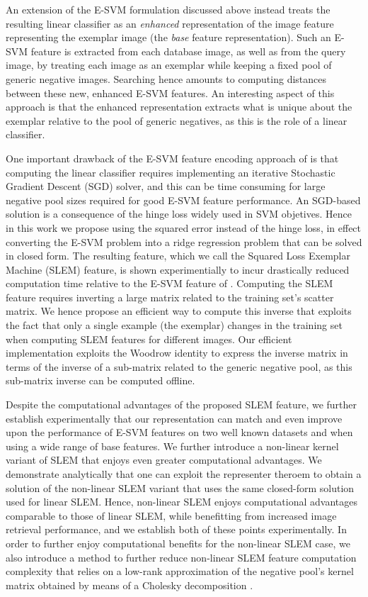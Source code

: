 An extension \cite{ZePe15} of the E-SVM formulation discussed above instead treats the resulting linear classifier as an \emph{enhanced} representation of the image feature representing the exemplar image (the \emph{base} feature representation). Such an E-SVM feature is extracted from each database image, as well as from the query image, by treating each image as an exemplar while keeping a fixed pool of generic negative images. Searching hence amounts to computing distances between these new, enhanced E-SVM features. An interesting aspect of this approach is that the enhanced representation extracts what is unique about the exemplar relative to the pool of generic negatives, as this is the role of a linear classifier.

One important drawback of the E-SVM feature encoding approach of \cite{ZePe15} is that computing the linear classifier requires implementing an iterative Stochastic Gradient Descent (SGD) solver, and this can be time consuming for large negative pool sizes required for good E-SVM feature performance. An SGD-based solution is a consequence of the hinge loss widely used in SVM objetives. Hence in this work we  propose using the squared error instead of the hinge loss, in effect converting the E-SVM problem into a ridge regression problem that can be solved in closed form. The resulting feature, which we call the Squared Loss Exemplar Machine (SLEM) feature, is shown experimentially to incur drastically reduced computation time relative to the E-SVM feature of \cite{ZePe15}. Computing the SLEM feature requires inverting a large matrix related to the training set's scatter matrix. We hence propose an efficient way to compute this inverse that exploits the fact that only a single example (the exemplar) changes in the training set when computing SLEM features for different images. Our efficient implementation exploits the Woodrow identity to express the inverse matrix in terms of the inverse of a sub-matrix related to the generic negative pool, as this sub-matrix inverse can be computed offline.

Despite the computational advantages of the proposed SLEM feature, we further establish experimentally that our representation can match and even improve upon the performance of E-SVM features on two well known datasets and when using a wide range of base features. We further introduce a non-linear kernel variant of SLEM that enjoys even greater computational advantages. We demonstrate analytically that one can exploit the representer theroem to obtain a solution of the non-linear SLEM variant that uses the same closed-form solution used for linear SLEM. Hence, non-linear SLEM enjoys computational advantages comparable to those of linear SLEM, while benefitting from increased image retrieval performance, and we establish both of these points experimentally. In order to further enjoy computational benefits for the non-linear SLEM case, we also introduce a method to further reduce non-linear SLEM feature computation complexity that relies on a low-rank approximation of the negative pool's  kernel matrix obtained by means of a Cholesky decomposition \cite{Bach}.


